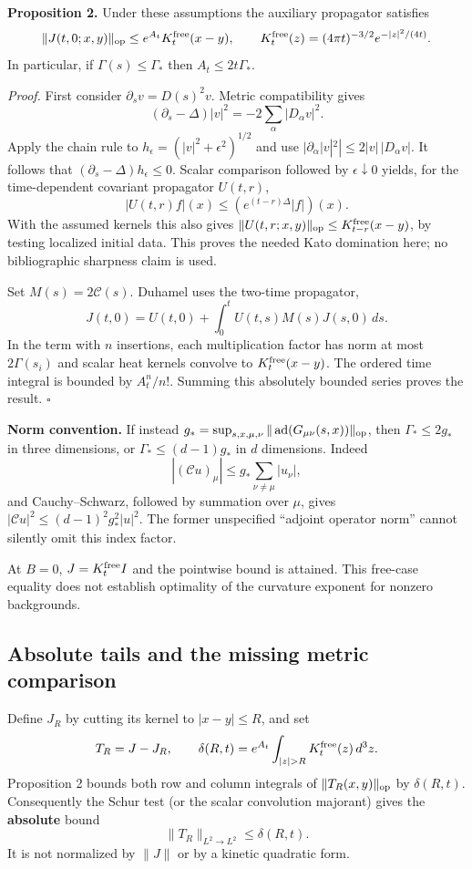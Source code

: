 \documentclass[11pt,a4paper]{article}
\begin{document}
\textbf{Proposition 2.} Under these assumptions the auxiliary propagator
satisfies \[\|J(t,0;x,y)\|_{\rm op}\le e^{A_t}K_t^{\rm free}(x-y),
\qquad K_t^{\rm free}(z)=(4\pi t)^{-3/2}e^{-|z|^2/(4t)}.\] In
particular, if \(\Gamma(s)\le\Gamma_*\) then \(A_t\le2t\Gamma_*\).

\emph{Proof.} First consider \(\partial_s v=D(s)^2v\). Metric
compatibility gives
\[(\partial_s-\Delta)|v|^2=-2\sum_\alpha|D_\alpha v|^2.\] Apply the
chain rule to \(h_\epsilon=(|v|^2+\epsilon^2)^{1/2}\) and use
\(|\partial_\alpha|v|^2|\le2|v|\,|D_\alpha v|\). It follows that
\((\partial_s-\Delta)h_\epsilon\le0\). Scalar comparison followed by
\(\epsilon\downarrow0\) yields, for the time-dependent covariant
propagator \(U(t,r)\), \[|U(t,r)f|(x)\le(e^{(t-r)\Delta}|f|)(x).\] With
the assumed kernels this also gives
\(\|U(t,r;x,y)\|_{\rm op}\le K_{t-r}^{\rm free}(x-y)\), by testing
localized initial data. This proves the needed Kato domination here; no
bibliographic sharpness claim is used.

Set \(M(s)=2\mathcal C(s)\). Duhamel uses the two-time propagator,
\[J(t,0)=U(t,0)+\int_0^t U(t,s)M(s)J(s,0)\,ds.\] In the term with \(n\)
insertions, each multiplication factor has norm at most \(2\Gamma(s_i)\)
and scalar heat kernels convolve to \(K_t^{\rm free}(x-y)\). The ordered
time integral is bounded by \(A_t^n/n!\). Summing this absolutely
bounded series proves the result. \(\square\)

\textbf{Norm convention.} If instead
\(g_*=\sup_{s,x,\mu,\nu}\|\operatorname{ad}(G_{\mu\nu}(s,x))\|_{\rm op}\),
then \(\Gamma_*\le2g_*\) in three dimensions, or \(\Gamma_*\le(d-1)g_*\)
in \(d\) dimensions. Indeed
\[|(\mathcal Cu)_\mu|\le g_*\sum_{\nu\ne\mu}|u_\nu|,\] and
Cauchy--Schwarz, followed by summation over \(\mu\), gives
\(|\mathcal Cu|^2\le(d-1)^2g_*^2|u|^2\). The former unspecified
``adjoint operator norm'' cannot silently omit this index factor.

At \(B=0\), \(J=K_t^{\rm free}I\) and the pointwise bound is attained.
This free-case equality does not establish optimality of the curvature
exponent for nonzero backgrounds.

\hypertarget{absolute-tails-and-the-missing-metric-comparison}{%
\subsection{Absolute tails and the missing metric
comparison}\label{absolute-tails-and-the-missing-metric-comparison}}

Define \(J_R\) by cutting its kernel to \(|x-y|\le R\), and set
\[T_R=J-J_R,\qquad
\delta(R,t)=e^{A_t}\int_{|z|>R}K_t^{\rm free}(z)\,d^3z.\] Proposition 2
bounds both row and column integrals of \(\|T_R(x,y)\|_{\rm op}\) by
\(\delta(R,t)\). Consequently the Schur test (or the scalar convolution
majorant) gives the \textbf{absolute} bound
\[\|T_R\|_{L^2\to L^2}\le\delta(R,t).\] It is not normalized by
\(\|J\|\) or by a kinetic quadratic form.
\end{document}
